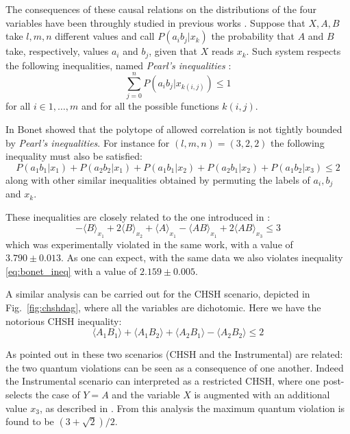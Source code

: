 \documentclass[floatfix, twocolumn, aps, prl]{revtex4-1}
\newcommand{\avg}[1]{\langle#1\rangle}
\begin{document}
The consequences of these causal relations on the distributions of the four
variables have been throughly studied in previous works \cite{pearl1995,
bonet2001}.
Suppose that $X, A, B$ take $l,m,n$ different values and 
call $P(a_i b_j | x_k)$ the probability that $A$ and $B$ take, respectively, values $a_i$
and $b_j$, given that $X$ reads $x_k$.
Such system respects the following inequalities,
named \emph{Pearl's inequalities} \cite{pearl1995}:
\begin{equation}
    \sum_{j=0}^{n} P(a_i b_j|x_{k(i,j)}) \le 1
    \label{eq:pearl_ineq}
\end{equation}
for all $i \in {1,\ldots, m}$ and for all the possible functions $k(i,j)$.

In \cite{bonet2001} Bonet showed that the polytope of allowed
correlation is not tightly bounded by \emph{Pearl's inequalities}.
For instance for $(l,m,n) = (3,2,2)$ the following inequality must also be satisfied:
\begin{equation}
    P(a_1 b_1 | x_1) + P(a_2 b_2 | x_1) + 
    P(a_1 b_1 | x_2) + P(a_2 b_1 | x_2) + 
    P(a_1 b_2 | x_3) \le 2
    \label{eq:bonet_ineq}
\end{equation}
along with other similar inequalities obtained by permuting the labels of
$a_i,b_j$ and $x_k$.


These inequalities are closely related to the one introduced in \cite{chaves2018}:
\begin{equation}
    -\avg{B}_{x_1} + 2 \avg{B}_{x_2} + \avg{A}_{x_1} - \avg{AB}_{x_1} +
    2\avg{AB}_{x_3} \le 3  
    \label{eq:rafael_ineq}
\end{equation}
which was experimentally violated in the same work, with a value of $3.790 \pm 0.013$.
As one can expect, with the same data we also violates inequality
\eqref{eq:bonet_ineq} with a value of $2.159 \pm 0.005$.

A similar analysis can be carried out for the CHSH scenario, depicted in
Fig.~\ref{fig:chshdag},
where all the variables are dichotomic.
Here we have the notorious CHSH inequality:
\begin{equation}
    \avg{A_1B_1} + \avg{A_1B_2} + \avg{A_2B_1} - \avg{A_2B_2} \le 2
    \label{eq:chsh_ineq}
\end{equation}

As pointed out in \cite{himbeeck2018} these two scenarios (CHSH and the Instrumental)
are related: the two quantum violations can be
seen as a consequence of one another.
Indeed the Instrumental scenario can interpreted as a restricted CHSH,
where one post-selects the case of $Y = A$ and the variable $X$ is augmented with
an additional value $x_3$, as described in \cite{himbeeck2018}.
From this analysis the maximum quantum violation is found to be $(3 + \sqrt{2})/2$.
\end{document}
